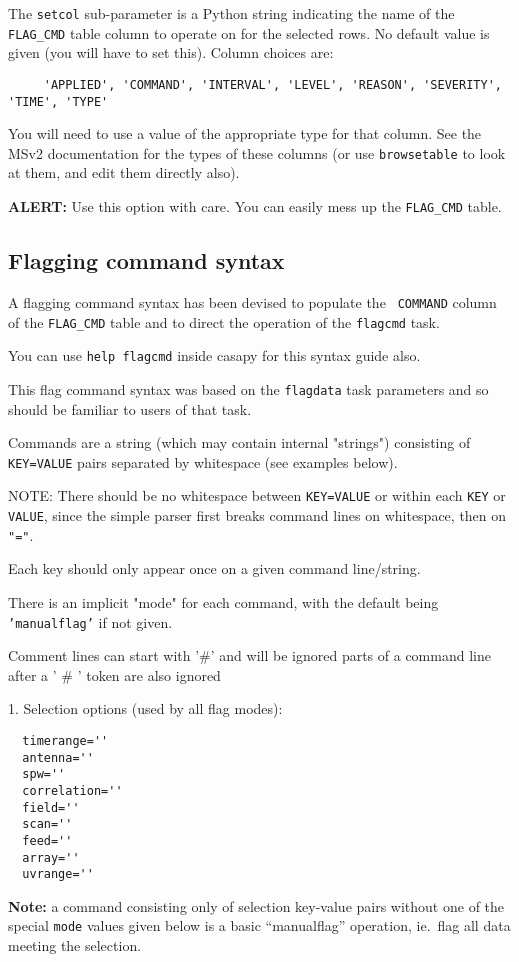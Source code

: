 The {\tt setcol} sub-parameter is a Python string indicating the name
of the {\tt FLAG\_CMD} table column to operate on for the selected 
rows.  No default value is given (you will have to set this).  Column
choices are:
\begin{verbatim}
     'APPLIED', 'COMMAND', 'INTERVAL', 'LEVEL', 'REASON', 'SEVERITY', 'TIME', 'TYPE'
\end{verbatim}
You will need to use a value of the appropriate type for that column.
See the MSv2 documentation for the types of these columns (or use 
{\tt browsetable} to look at them, and edit them directly also).

{\bf ALERT:} Use this option with care.  You can easily mess up the
{\tt FLAG\_CMD} table.

\subsection{Flagging command syntax}
\label{section:edit.flagcmd.syntax}

A flagging command syntax has been devised to populate the {\tt
COMMAND} column of the {\tt FLAG\_CMD} table and to direct the 
operation of the {\tt flagcmd} task.

You can use {\tt help flagcmd} inside casapy for this syntax guide also.

This flag command syntax was based on the {\tt flagdata} task
parameters and so should be familiar to users of that task.

Commands are a string (which may contain internal "strings") consisting of
{\tt KEY=VALUE} pairs separated by whitespace (see examples below). 

NOTE: There should be no whitespace between {\tt KEY=VALUE} or within
each {\tt KEY} or {\tt VALUE}, since the simple parser first breaks
command lines on whitespace, then on {\tt "="}.

Each key should only appear once on a given command line/string.

There is an implicit "mode" for each command, with the default
being {\tt 'manualflag'} if not given.

Comment lines can start with '\#' and will be ignored
parts of a command line after a ' \# ' token are also ignored

1. Selection options (used by all flag modes):
\begin{verbatim}
  timerange=''
  antenna=''
  spw=''
  correlation=''
  field=''
  scan=''
  feed=''
  array=''
  uvrange=''
\end{verbatim}
{\bf Note:} a command consisting only of selection key-value pairs
without one of the special {\tt mode} values given below is a 
basic ``manualflag'' operation, 
ie.\ flag all data meeting the selection.

